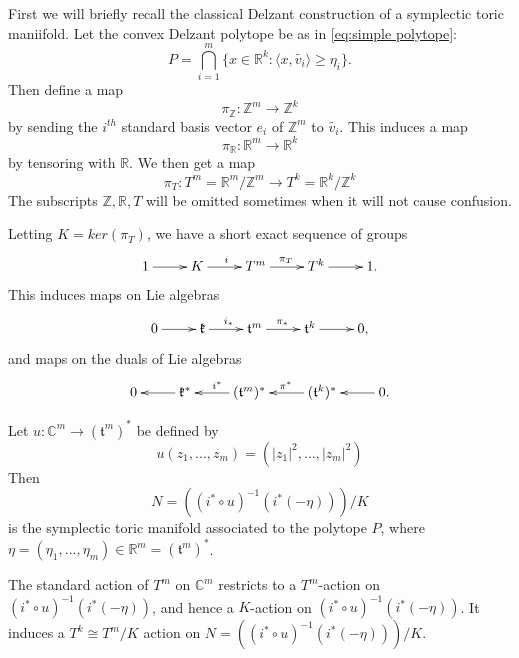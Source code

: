 \documentclass[12pt]{amsart}
\def\Z {{\mathbb{Z}}}
\def\R {{\mathbb{R}}}
\def\C {{\mathbb{C}}}
\theoremstyle{definition}
\numberwithin{equation}{section}
\begin{document}
 First we will briefly recall the classical Delzant construction of a symplectic toric
 maniifold.
Let the convex Delzant polytope be as in \eqref{eq:simple polytope}:
\begin{equation}
P= \bigcap_{i=1}^{m}\{x\in \R^k: \langle x, \tilde{v_{i}}\rangle
\geq \eta_{i}\}.\end{equation}
 Then define a map
\begin{equation}\label{eq:pi_Z}
\pi_{\Z}: \Z^m\rightarrow \Z^k
\end{equation}
by sending the $i^{th}$ standard basis vector $e_{i}$ of $\Z^m$ to
$\tilde{v_{i}}$. This induces a map
\begin{equation}
\pi_{\R}: \R^m\rightarrow \R^k
\end{equation}
by tensoring with $\R$. We then get a map
\begin{equation}\label{eq:pi_T}
\pi_{T}: T^m=\R^m/\Z^m \rightarrow T^k=\R^k/\Z^k
\end{equation}
The subscripts $\Z,\R,T$ will be omitted sometimes when it will not
cause confusion.

Letting $K=ker(\pi_{T})$, we have a short exact sequence of groups
\begin{equation}\label{eq:KT^mT^k}
\xymatrix{
  1 \ar[r]^{} & K \ar[r]^{i} & T^m \ar[r]^{\pi_{T}} & T^k \ar[r]^{} & 1.   }
\end{equation}
This induces maps on Lie algebras
\begin{equation}
\xymatrix{
  0 \ar[r]^{} & \mathfrak{k} \ar[r]^{i_{*}} & \mathfrak{t}^m \ar[r]^{\pi_{*}} & \mathfrak{t}^k \ar[r]^{} & 0 ,  }
\end{equation}
and maps on the duals of Lie algebras
\begin{equation}\xymatrix{0 & \mathfrak{k}^*\ar[l]^{} &
(\mathfrak{t}^m)^* \ar[l]_{i^*}& (\mathfrak{t}^k)^*\ar[l]_{\pi^*}&
0.\ar[l]}
\end{equation}

Let $u:\C^m\rightarrow (\mathfrak{t}^m)^*$ be defined by
\begin{equation}\label{eq:std moment}
u(z_{1},...,z_{m})=(|z_{1}|^2,...,|z_{m}|^2)
\end{equation}
Then
\begin{equation}\label{eq:toric manifold as quotient}
N=((i^*\circ u)^{-1}(i^{*}(-\eta)))/K
\end{equation}
is the symplectic toric manifold associated to the polytope $P$,
where $\eta=(\eta_{1},...,\eta_{m})\in \R^m= (\mathfrak{t}^m)^*$.

The standard action of $T^m$ on $\C^m$ restricts to a $T^m$-action
on $(i^*\circ u)^{-1}(i^{*}(-\eta))$, and hence a $K$-action on
$(i^*\circ u)^{-1}(i^{*}(-\eta))$. It induces a $T^k\cong T^m/K$
action on $N=((i^*\circ u)^{-1}(i^{*}(-\eta)))/K$.
\end{document}
